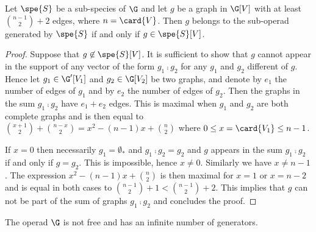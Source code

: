 \begin{lemma} \label{lem:infinite_number_generators_G}
    Let $\spe{S}$ be a sub-species of $\G$ and let $g$ be a graph in $\G[V]$ with at least $\binom{n-1}{2} +2$ 
    edges, where $n = \card{V}$. Then $g$ belongs to the sub-operad generated by $\spe{S}$ if and only if $g\in\spe{S}[V]$.
\end{lemma}

\begin{proof}
    Suppose that $g\not\in\spe{S}[V]$. It is sufficient to show that $g$ cannot appear in the support of any 
    vector of the form $g_1\comp g_2$ for any $g_1$ and $g_2$ different of $g$. Hence let $g_1\in \G'[V_1]$ 
    and $g_2\in \G[V_2]$ be two graphs, and denote by $e_1$ the number of edges of $g_1$ and by $e_2$ the 
    number of edges of $g_2$. Then the graphs in the sum $g_1\comp g_2$ have $e_1+e_2$ edges. This is maximal
    when $g_1$ and $g_2$ are both complete graphs and is then equal to 
    $\binom{x+1}{2}+\binom{n-x}{2} = x^2-(n-1)x+\binom{n}{2}$ where $0\leq x=\card{V_1}\leq n-1$.

    If $x = 0$ then necessarily $g_1 =\emptyset_{\ast}$ and $g_1\comp g_2 = g_2$ and $g$ appears in the sum 
    $g_1\comp g_2$ if and only if $g=g_2$. This is impossible, hence $x\not = 0$. Similarly we have 
    $x\not = n-1$. The expression $x^2-(n-1)x+\binom{n}{2}$ is then maximal for $x=1$ or $x=n-2$ and is 
    equal in both cases to $\binom{n-1}{2}+1<\binom{n-1}{2} +2$. This implies that $g$ can not be part of the 
    sum of graphs $g_1\comp g_2$ and concludes the proof.
\end{proof}

\begin{prop} \label{gc} 
    The operad $\G$ is not free and has an infinite number of generators.
\end{prop}

